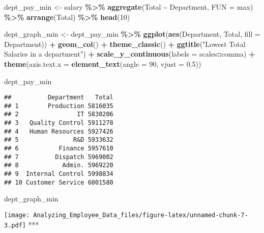 \documentclass[
]{article}
\newenvironment{Shaded}{\begin{snugshade}}{\end{snugshade}}
\newcommand{\AttributeTok}[1]{\textcolor[rgb]{0.13,0.29,0.53}{#1}}
\newcommand{\DecValTok}[1]{\textcolor[rgb]{0.00,0.00,0.81}{#1}}
\newcommand{\FloatTok}[1]{\textcolor[rgb]{0.00,0.00,0.81}{#1}}
\newcommand{\FunctionTok}[1]{\textcolor[rgb]{0.13,0.29,0.53}{\textbf{#1}}}
\newcommand{\NormalTok}[1]{#1}
\newcommand{\OtherTok}[1]{\textcolor[rgb]{0.56,0.35,0.01}{#1}}
\newcommand{\SpecialCharTok}[1]{\textcolor[rgb]{0.81,0.36,0.00}{\textbf{#1}}}
\newcommand{\StringTok}[1]{\textcolor[rgb]{0.31,0.60,0.02}{#1}}
\begin{document}
\begin{Shaded}
\begin{Highlighting}[]
\NormalTok{dept\_pay\_min }\OtherTok{\textless{}{-}}\NormalTok{ salary }\SpecialCharTok{\%\textgreater{}\%} 
  \FunctionTok{aggregate}\NormalTok{(Total }\SpecialCharTok{\textasciitilde{}}\NormalTok{ Department,}
            \AttributeTok{FUN =}\NormalTok{ max) }\SpecialCharTok{\%\textgreater{}\%}
  \FunctionTok{arrange}\NormalTok{(Total) }\SpecialCharTok{\%\textgreater{}\%} 
  \FunctionTok{head}\NormalTok{(}\DecValTok{10}\NormalTok{)}

\NormalTok{dept\_graph\_min }\OtherTok{\textless{}{-}}\NormalTok{ dept\_pay\_min }\SpecialCharTok{\%\textgreater{}\%}
  \FunctionTok{ggplot}\NormalTok{(}\FunctionTok{aes}\NormalTok{(Department,}
\NormalTok{             Total,}
             \AttributeTok{fill =}\NormalTok{ Department)) }\SpecialCharTok{+} 
  \FunctionTok{geom\_col}\NormalTok{() }\SpecialCharTok{+} 
  \FunctionTok{theme\_classic}\NormalTok{() }\SpecialCharTok{+} 
  \FunctionTok{ggtitle}\NormalTok{(}\StringTok{"Lowest Total Salaries in a department"}\NormalTok{) }\SpecialCharTok{+}
  \FunctionTok{scale\_y\_continuous}\NormalTok{(}\AttributeTok{labels =}\NormalTok{ scales}\SpecialCharTok{::}\NormalTok{comma) }\SpecialCharTok{+} 
  \FunctionTok{theme}\NormalTok{(}\AttributeTok{axis.text.x =} \FunctionTok{element\_text}\NormalTok{(}\AttributeTok{angle =} \DecValTok{90}\NormalTok{, }\AttributeTok{vjust =} \FloatTok{0.5}\NormalTok{))}


\NormalTok{dept\_pay\_min}
\end{Highlighting}
\end{Shaded}

\begin{verbatim}
##          Department   Total
## 1        Production 5816035
## 2                IT 5830206
## 3   Quality Control 5911278
## 4   Human Resources 5927426
## 5               R&D 5933632
## 6           Finance 5957610
## 7          Dispatch 5969002
## 8            Admin. 5969220
## 9  Internal Control 5998834
## 10 Customer Service 6001580
\end{verbatim}

\begin{Shaded}
\begin{Highlighting}[]
\NormalTok{dept\_graph\_min }
\end{Highlighting}
\end{Shaded}

\texttt{[image: Analyzing\_Employee\_Data\_files/figure-latex/unnamed-chunk-7-3.pdf]}
***
\end{document}
